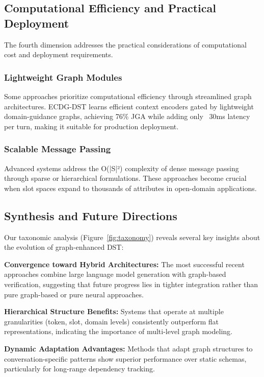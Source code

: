 \documentclass[11pt]{article}
\begin{document}
\subsection{Computational Efficiency and Practical Deployment}

The fourth dimension addresses the practical considerations of computational cost and deployment requirements.

\subsubsection{Lightweight Graph Modules}
Some approaches prioritize computational efficiency through streamlined graph architectures. ECDG-DST \citep{kim2025ecdg} learns efficient context encoders gated by lightweight domain-guidance graphs, achieving 76\% JGA while adding only ~30ms latency per turn, making it suitable for production deployment.

\subsubsection{Scalable Message Passing}
Advanced systems address the O(|S|²) complexity of dense message passing through sparse or hierarchical formulations. These approaches become crucial when slot spaces expand to thousands of attributes in open-domain applications.

\subsection{Synthesis and Future Directions}

Our taxonomic analysis (Figure~\ref{fig:taxonomy}) reveals several key insights about the evolution of graph-enhanced DST:

\textbf{Convergence toward Hybrid Architectures:} The most successful recent approaches combine large language model generation with graph-based verification, suggesting that future progress lies in tighter integration rather than pure graph-based or pure neural approaches.

\textbf{Hierarchical Structure Benefits:} Systems that operate at multiple granularities (token, slot, domain levels) consistently outperform flat representations, indicating the importance of multi-level graph modeling.

\textbf{Dynamic Adaptation Advantages:} Methods that adapt graph structures to conversation-specific patterns show superior performance over static schemas, particularly for long-range dependency tracking.
\end{document}
